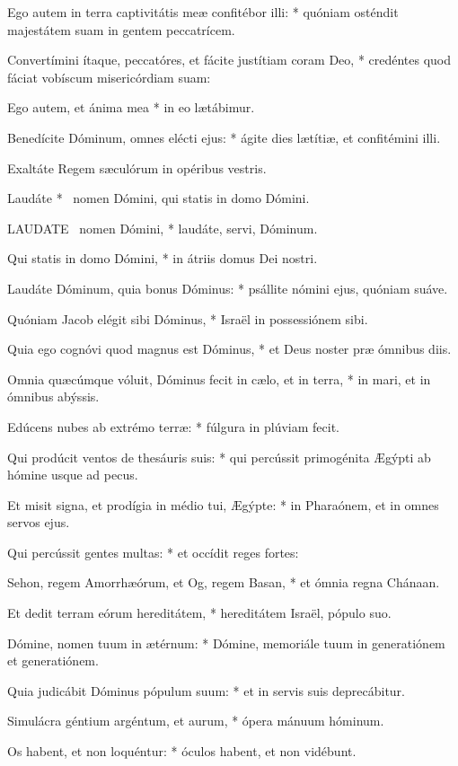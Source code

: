 Ego autem in terra captivitátis meæ confitébor illi: * quóniam osténdit majestátem suam in gentem peccatrícem.

Convertímini ítaque, peccatóres, et fácite justítiam coram Deo, * credéntes quod fáciat vobíscum misericórdiam suam:

Ego autem, et ánima mea * in eo lætábimur.

Benedícite Dóminum, omnes elécti ejus: * ágite dies lætítiæ, et confitémini illi.

 Exaltáte Regem sæculórum in opéribus vestris.

 Laudáte * \textdagger\ nomen Dómini, qui statis in domo Dómini.


\lettrine[lines=2]{L}{AUDATE} \textdagger\ nomen Dómini, * laudáte, servi, Dóminum.

Qui statis in domo Dómini, * in átriis domus Dei nostri.

Laudáte Dóminum, quia bonus Dóminus: * psállite nómini ejus, quóniam suáve.

Quóniam Jacob elégit sibi Dóminus, * Israël in possessiónem sibi.

Quia ego cognóvi quod magnus est Dóminus, * et Deus noster præ ómnibus diis.

Omnia quæcúmque vóluit, Dóminus fecit in cælo, et in terra, * in mari, et in ómnibus abýssis.

Edúcens nubes ab extrémo terræ: * fúlgura in plúviam fecit.

Qui prodúcit ventos de thesáuris suis: * qui percússit primogénita Ægýpti ab hómine usque ad pecus.

Et misit signa, et prodígia in médio tui, Ægýpte: * in Pharaónem, et in omnes servos ejus.

Qui percússit gentes multas: * et occídit reges fortes:

Sehon, regem Amorrhæórum, et Og, regem Basan, * et ómnia regna Chánaan.

Et dedit terram eórum hereditátem, * hereditátem Israël, pópulo suo.

Dómine, nomen tuum in ætérnum: * Dómine, memoriále tuum in generatiónem et generatiónem.

Quia judicábit Dóminus pópulum suum: * et in servis suis deprecábitur.

Simulácra géntium argéntum, et aurum, * ópera mánuum hóminum.

Os habent, et non loquéntur: * óculos habent, et non vidébunt.

